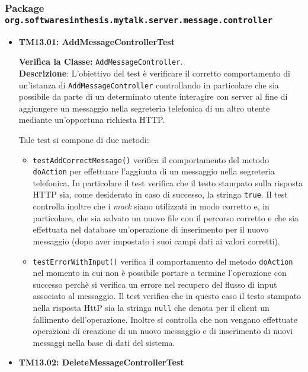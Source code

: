 \subsubsection{Package \texttt{org.softwaresinthesis.mytalk.server.message.controller}}
\begin{itemize}

\item \textbf{TM13.01: AddMessageControllerTest} 

\textbf{Verifica la Classe:} \texttt{AddMessageController}.\\
\textbf{Descrizione}: L'obiettivo del test è verificare il corretto comportamento di un'istanza di \texttt{AddMessageController} controllando in particolare che sia possibile da parte di un determinato utente interagire con server al fine di aggiungere un messaggio nella segreteria telefonica di un altro utente mediante un'opportuna richiesta HTTP\@.

Tale test si compone di due metodi:
\begin{itemize}
\item \texttt{testAddCorrectMessage()} verifica il comportamento del metodo \texttt{doAction} per effettuare l'aggiunta di un messaggio nella segreteria telefonica. In particolare il test verifica che il testo stampato sulla risposta HTTP sia, come desiderato in caso di successo, la stringa \texttt{true}. Il test controlla inoltre che i \textit{mock} siano utilizzati in modo corretto e, in particolare, che sia salvato un nuovo file con il percorso corretto e che sia effettuata nel database un'operazione di inserimento per il nuovo messaggio (dopo aver impostato i suoi campi dati ai valori corretti).

\item \texttt{testErrorWithInput()} verifica il comportamento del metodo \texttt{doAction} nel momento in cui non è possibile portare a termine l'operazione con successo perchè si verifica un errore nel recupero del flusso di input associato al messaggio. Il test verifica che in questo caso il testo stampato nella risposta HttP sia la stringa \texttt{null} che denota per il client un fallimento dell'operazione. Inoltre si controlla che non vengano effettuate operazioni di creazione di un nuovo messaggio e di inserimento di nuovi messaggi nella base di dati del sistema.

\end{itemize}


\item \textbf{TM13.02: DeleteMessageControllerTest} 


\end{itemize}
